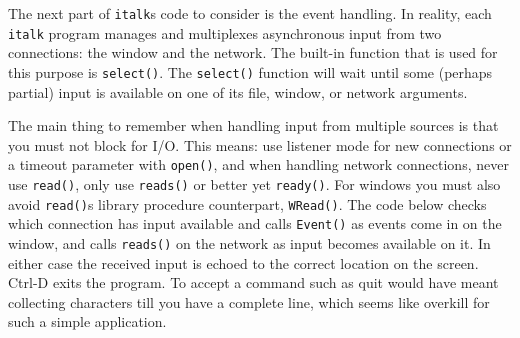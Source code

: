 The next part of \texttt{italk}{\textquotesingle}s code to consider is
the event handling. In reality, each \texttt{italk} program manages and
multiplexes asynchronous input from two connections: the window and the
network. The built-in function that is used for this purpose is
\texttt{select()}. The \texttt{select()} function will wait until some
(perhaps partial) input is available on one of its file, window, or
network arguments.

The main thing to remember when handling input from multiple
sources is that you must not block for I/O. This means: use listener
mode for new connections or a timeout parameter with \texttt{open()},
and when handling network connections, never use \texttt{read()},
only use \texttt{reads()} or better yet \texttt{ready()}.
For windows you must also avoid
\texttt{read()}{\textquotesingle}s library procedure counterpart,
\texttt{WRead()}. The code below checks which connection has input
available and calls \texttt{Event()} as events come in on the window,
and calls \texttt{reads()} on the network as input becomes available on
it. In either case the received input is echoed to the correct location
on the screen. Ctrl-D exits the program. To accept a command such as
{\textquotedbl}quit{\textquotedbl} would have meant collecting
characters till you have a complete line, which seems like overkill for
such a simple application.


